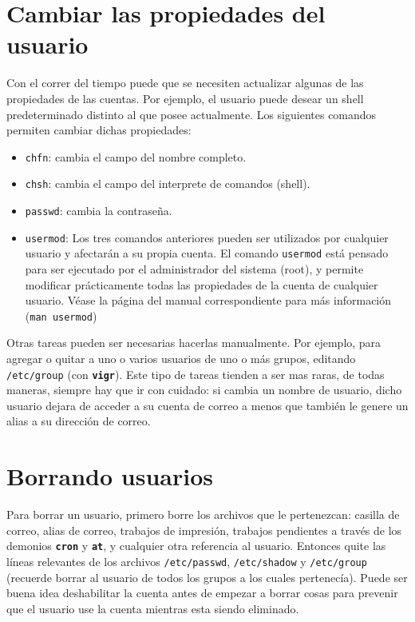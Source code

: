 \documentclass[12pt]{article}
\begin{document}
\section{Cambiar las propiedades del usuario}
Con el correr del tiempo puede que se necesiten actualizar algunas de las 
propiedades de las cuentas. Por ejemplo, el usuario puede desear un shell 
predeterminado distinto al que posee actualmente. Los siguientes comandos 
permiten cambiar dichas propiedades: 

\begin{itemize}
\item 	\texttt{chfn}:  cambia el campo del nombre completo.
\item 	\texttt{chsh}:  cambia el campo del interprete de comandos (shell).
\item 	\texttt{passwd}: cambia la contraseña. 
\item 	\texttt{usermod}: Los tres comandos anteriores pueden ser utilizados 
por cualquier usuario y afectarán a su propia cuenta. El comando \texttt{usermod}
está pensado para ser ejecutado por el administrador del sistema (root), y 
permite modificar prácticamente todas las propiedades de la cuenta de cualquier 
usuario. Véase la página del manual correspondiente para más información
(\texttt{man usermod})
\end{itemize}


Otras tareas pueden ser necesarias hacerlas manualmente. Por ejemplo,
para agregar o quitar a uno o varios usuarios
de uno o más grupos, editando \texttt{/etc/group} (con
\texttt{\textbf{vigr}}). Este tipo de tareas tienden a ser mas raras, de todas
maneras, siempre hay que ir con cuidado: si cambia un nombre de usuario, dicho
usuario dejara de acceder a su cuenta de correo a menos que también le genere un
alias a su dirección de correo.
	
\section{Borrando usuarios}

Para borrar un usuario, primero borre los archivos que le pertenezcan:
casilla de correo, alias de correo, trabajos de impresión, trabajos pendientes a
través de los demonios \texttt{\textbf{cron}} y \texttt{\textbf{at}}, y
cualquier otra referencia al usuario.  Entonces quite las 
líneas relevantes de los archivos \texttt{/etc/passwd},  \texttt{/etc/shadow} y
\texttt{/etc/group} (recuerde borrar al usuario de todos los grupos
a los cuales pertenecía).  Puede ser buena idea deshabilitar la cuenta antes de
empezar a borrar cosas para prevenir que el usuario use la cuenta mientras esta
siendo eliminado.
\end{document}
